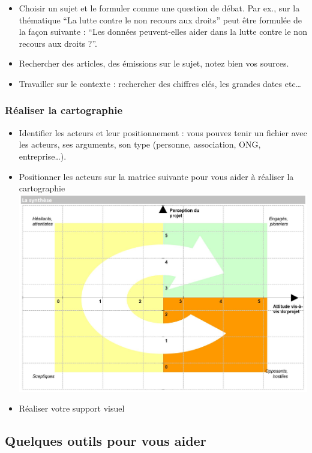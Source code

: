 \documentclass[
  letterpaper,
  DIV=11,
  numbers=noendperiod]{scrreprt}
\begin{document}
\begin{itemize}
\item
  Choisir un sujet et le formuler comme une question de débat. Par ex.,
  sur la thématique ``La lutte contre le non recours aux droits'' peut
  être formulée de la façon suivante : ``Les données peuvent-elles aider
  dans la lutte contre le non recours aux droits ?''.
\item
  Rechercher des articles, des émissions sur le sujet, notez bien vos
  sources.
\item
  Travailler sur le contexte : rechercher des chiffres clés, les grandes
  dates etc\ldots{}
\end{itemize}

\hypertarget{ruxe9aliser-la-cartographie}{%
\subsubsection{Réaliser la
cartographie}\label{ruxe9aliser-la-cartographie}}

\begin{itemize}
\item
  Identifier les acteurs et leur positionnement : vous pouvez tenir un
  fichier avec les acteurs, ses arguments, son type (personne,
  association, ONG, entreprise\ldots).
\item
  Positionner les acteurs sur la matrice suivante pour vous aider à
  réaliser la
  cartographie\includegraphics{./images/acteurs_cartographie.jpg}
\item
  Réaliser votre support visuel
\end{itemize}

\hypertarget{quelques-outils-pour-vous-aider}{%
\subsection{Quelques outils pour vous
aider}\label{quelques-outils-pour-vous-aider}}
\end{document}
